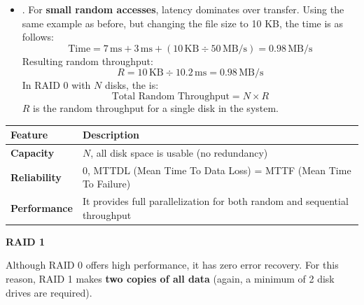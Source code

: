 \begin{itemize}
    \item {}. For \textbf{small random accesses}, latency dominates over transfer. Using the same example as before, but changing the file size to 10 KB, the time is as follows:
    \begin{equation*}
        \text{Time} = 7\,\text{ms} + 3\,\text{ms} + \left( 10\,\text{KB} \div 50\,\text{MB/s} \right) = 0.98\,\text{MB/s}
    \end{equation*}
    Resulting random throughput:
    \begin{equation*}
        R = 10\,\text{KB} \div 10.2\,\text{ms} = 0.98\,\text{MB/s}
    \end{equation*}
    In RAID 0 with $N$ disks, the  is:
    \begin{equation}
        \text{Total Random Throughput} = N \times R
    \end{equation}
    $R$ is the random throughput for a single disk in the system.
\end{itemize}

\begin{table}[!htp]
    \centering
    \begin{adjustbox}{width={0.9\textwidth},totalheight={\textheight},keepaspectratio}
        \begin{tabular}{@{} l | p{27em} @{}}
            \toprule
            Feature & Description \\
            \midrule
            \textbf{Capacity}       & $N$, all disk space is usable (no redundancy) \\ [.3em]
            \textbf{Reliability}    & 0, MTTDL (Mean Time To Data Loss) = MTTF (Mean Time To Failure) \\ [.3em]
            \textbf{Performance}    & It provides full parallelization for both random and sequential throughput \\
            \bottomrule
        \end{tabular}
    \end{adjustbox}
\end{table}

\newpage

\begin{center}\label{RAID 1}
    \large
    \hypertarget{RAID 1}{\textcolor{Red2}{\textbf{RAID 1}}}
\end{center}

\noindent
Although RAID 0 offers high performance, it has zero error recovery. For this reason, RAID 1 makes \textbf{two copies of all data} (again, a minimum of 2 disk drives are required).

